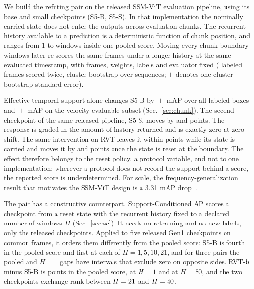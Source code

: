 \documentclass[10pt,twocolumn,letterpaper]{article}
\begin{document}
We build the refuting pair on the released SSM-ViT evaluation pipeline, using its base and small checkpoints (S5-B, S5-S). In that
implementation the nominally carried state does not enter the outputs across evaluation chunks. The recurrent
history available to a prediction is a deterministic function of chunk position, and ranges from
1 to \ssmEvalChunk{} windows inside one pooled score. Moving every chunk boundary
\ssmPairedShift{} windows later re-scores the same frames under a longer history at the same
evaluated timestamp, with frames, weights, labels and evaluator fixed
(\ssmPairedN{} labeled frames scored twice, cluster bootstrap over \outSeqsScanned{} sequences; $\pm$ denotes one cluster-bootstrap standard error).

Effective temporal support alone changes S5-B by \ssmPairedMapAllBase\,$\pm$\,\ssmPairedMapAllBaseSE{} mAP over all labeled
boxes and \ssmPairedMapVelBase\,$\pm$\,\ssmPairedMapVelBaseSE{} mAP on the velocity-evaluable
subset (Sec.~\ref{sec:chunk}). The second checkpoint of the same released pipeline, S5-S, moves by
\ssmPairedMapAllSmall{} and \ssmPairedMapVelSmall{} points. The response is graded in the amount of history returned and is exactly zero at zero shift. The same intervention on RVT leaves it within \rvtBoundCarryMax{} points while its state is carried and moves it by \rvtBoundResetS{} and \rvtBoundResetB{} points once the state is reset at the boundary. The effect therefore belongs to the reset policy, a protocol variable, and not to one implementation: wherever a protocol does not record the support behind a score, the reported score is underdetermined. For scale, the frequency-generalization result that motivates the SSM-ViT design is a 3.31 mAP drop~\cite{zubic2024ssm}.

The pair has a constructive counterpart. Support-Conditioned AP scores a checkpoint from a reset state with the recurrent history fixed to a declared number of windows $H$ (Sec.~\ref{sec:sc}). It needs no retraining and no new labels, only the released checkpoints. Applied to five released Gen1 checkpoints on \lhNFrames{} common frames, it orders them differently from the pooled score: S5-B is fourth in the pooled score and first at each of $H=1,5,10,21$, and for three pairs the pooled and $H=1$ gaps have intervals that exclude zero on opposite sides. RVT-\texttt{b} minus S5-B is \lhGapRbSbPool{} points in the pooled score, \lhGapRbSbHOne{} at $H=1$ and \lhGapRbSbHEighty{} at $H=80$, and the two checkpoints exchange rank between $H=21$ and $H=40$.
\end{document}
